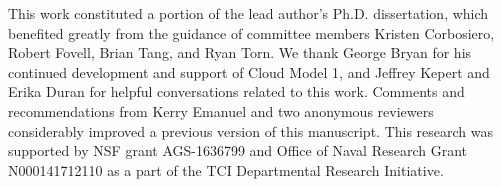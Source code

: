 \documentclass{ametsoc}
\begin{document}




%
\acknowledgments
This work constituted a portion of the lead author's Ph.D. dissertation, which benefited greatly from the guidance of committee members Kristen Corbosiero, Robert Fovell, Brian Tang, and Ryan Torn.
We thank George Bryan for his continued development and support of Cloud Model 1, and Jeffrey Kepert and Erika Duran for helpful conversations related to this work.
Comments and recommendations from Kerry Emanuel and two anonymous reviewers considerably improved a previous version of this manuscript.
This research was supported by NSF grant AGS-1636799 and Office of Naval Research Grant N000141712110 as a part of the TCI Departmental Research Initiative.

%

\end{document}
